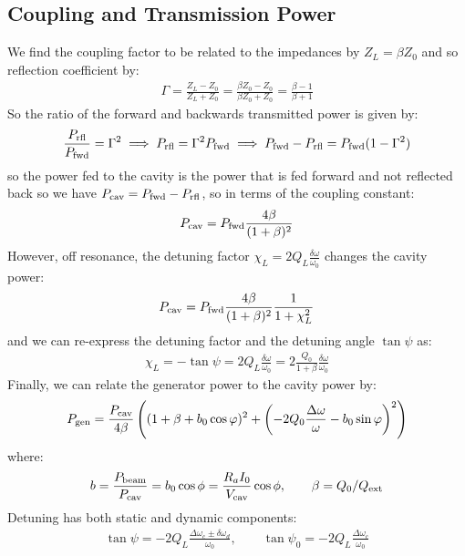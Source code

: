 \documentclass{article}
\numberwithin{equation}{section}
\begin{document}
\subsection{ Coupling and Transmission Power }
We find the coupling factor to be related to the impedances by $Z_L = \beta Z_0$ and so reflection coefficient by:
\begin{align}
\Gamma = \frac{Z_L - Z_0 }{Z_L + Z_0} = \frac{ \beta Z_0 - Z_0 }{ \beta Z_0 + Z_0} = \frac{\beta-1}{\beta+1}
\end{align}
So the ratio of the forward and backwards transmitted power is given by:
\begin{align}
\frac{P_{\rm rfl}}{P_{\rm fwd}} = \Gamma^2 \implies 
P_{\rm rfl} = \Gamma^2 P_{\rm fwd} \implies P_{\rm fwd} - P_{\rm rfl} = P_{\rm fwd}(1-\Gamma^2)
\end{align}
so the power fed to the cavity is the power that is fed forward and not reflected back so we have $P_{\rm cav} = P_{\rm fwd} - P_{\rm rfl}$, so in terms of the coupling constant:
\begin{align}
P_{\rm cav} = P_{\rm fwd}\frac{4 \beta}{(1+\beta)^2}
\end{align}
However, off resonance, the detuning factor $\chi_L = 2 Q_L \frac{\delta \omega}{\omega_0}$ changes the cavity power:
\begin{align}
P_{\rm cav} = P_{\rm fwd}\frac{4 \beta}{(1+\beta)^2} \frac{1}{1+ \chi_L^2}
\end{align}
and we can re-express the detuning factor and the detuning angle $\tan \psi$ as:
\begin{align}
\chi_L = - \tan \psi = 2 Q_L \frac{\delta \omega}{\omega_0} = 2 \frac{Q_0}{1+\beta} \frac{\delta \omega}{\omega_0}
\end{align}
Finally, we can relate the generator power to the cavity power by:
\begin{align}
P_{\rm gen} =  \frac{P_{\rm cav}}{4 \beta} \left( (1+\beta+b_0 \cos \varphi)^2 + \left( -2 Q_0 \frac{\Delta \omega}{\omega} - b_0 \sin \varphi \right)^2 \right)
\end{align}
where:
\begin{align}
b = \frac{P_{\rm beam}}{P_{\rm cav}} = b_0 \cos \phi = \frac{R_a I_0}{V_{\rm cav}} \cos \phi , \qquad
\beta = Q_0/Q_{\rm ext}
\end{align}
Detuning has both static and dynamic components:
\begin{align}
\tan \psi = - 2Q_L \frac{\Delta \omega_c \pm \delta \omega_d}{\omega_0} ,\qquad
\tan \psi_0 = - 2Q_L \frac{\Delta \omega_c}{\omega_0}
\end{align}
\end{document}
